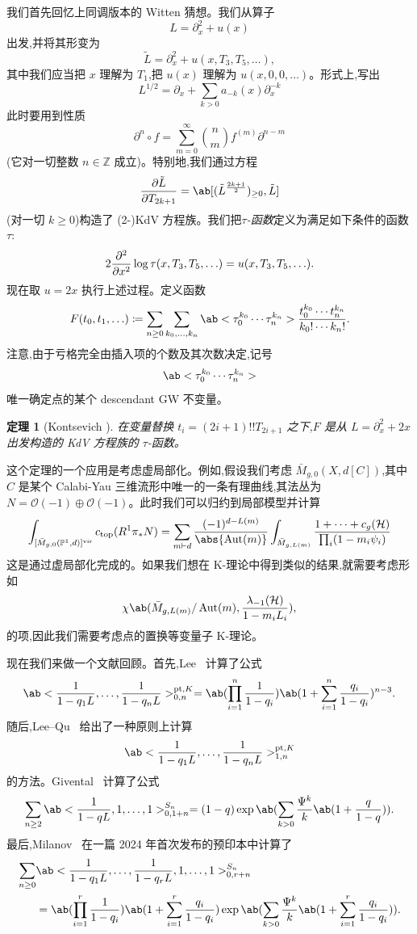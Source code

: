\documentclass{amsart}
\newtheorem{thm}{定理}[section]
\theoremstyle{definition}
\theoremstyle{remark}
\theoremstyle{plain}
\theoremstyle{definition}
\theoremstyle{remark}
\newcommand{\Z}{\mathbb{Z}}
\renewcommand{\P}{\mathbb{P}}
\newcommand{\mc}[1]{\mathcal{#1}}
\newcommand{\mr}[1]{\mathrm{#1}}
\newcommand{\1}{\mathbf{1}}
\newcommand{\2}{\mathbf{2}}
\newcommand{\3}{\mathbf{3}}
\newcommand{\vir}{\mr{vir}}
\DeclareMathOperator{\Aut}{Aut}
\begin{document}
我们首先回忆上同调版本的 Witten 猜想。我们从算子
\[ L = \partial_x^2 + u(x) \]
出发,并将其形变为
\[ \tilde{L} = \partial_x^2 + u(x, T_3, T_5, \ldots), \]
其中我们应当把 \(x\) 理解为 \(T_1\),把 \(u(x)\) 理解为 \(u(x, 0, 0,\ldots)\)。形式上,写出
\[ L^{1/2} = \partial_x + \sum_{k > 0} a_{-k}(x) \partial_x^{-k} \]
此时要用到性质
\[ \partial^n \circ f = \sum_{m = 0}^{\infty} \binom{n}{m} f^{(m)} \partial^{n-m} \]
(它对一切整数 \(n \in \Z\) 成立)。特别地,我们通过方程
\[ \pdv{\tilde{L}}{T_{2k+1}} = \ab[(\tilde{L}^{\frac{2k+1}{2}})_{\geq 0}, \tilde{L}] \]
(对一切 \(k \geq 0\))构造了 (2-)KdV 方程族。我们把\textit{\(\tau\)-函数}定义为满足如下条件的函数 \(\tau\):
\[ 2 \pdv[2]{}{x}\log \tau(x, T_3, T_5, \ldots) = u(x, T_3, T_5, \ldots). \]
现在取 \(u = 2x\) 执行上述过程。定义函数
\[ F(t_0, t_1, \ldots) \coloneqq \sum_{n \geq 0} \sum_{k_0, \ldots, k_n} \ab<\tau_0^{k_0} \cdots \tau_n^{k_n}> \frac{t_0^{k_0} \cdots t_n^{k_n}}{k_0! \cdots k_n!}. \]
注意,由于亏格完全由插入项的个数及其次数决定,记号
\[ \ab<\tau_0^{k_0} \cdots \tau_n^{k_n}> \]
唯一确定点的某个 descendant GW 不变量。

\begin{thm}[Kontsevich {\cite{Kontsevich1992}}]
    在变量替换 \(t_i = (2i+1)!! T_{2i+1}\) 之下,\(F\) 是从 \(L = \partial_x^2 + 2x\) 出发构造的 KdV 方程族的 \(\tau\)-函数。
\end{thm}

这个定理的一个应用是考虑虚局部化。例如,假设我们考虑 \(\bar{M}_{g,0}(X, d[C])\),其中 \(C\) 是某个 Calabi-Yau 三维流形中唯一的一条有理曲线,其法丛为 \(N = \mc{O}(-1)\oplus \mc{O}(-1)\)。此时我们可以归约到局部模型并计算
\begin{align*}
    \int_{[\bar{M}_{g,0}(\P^1, d)]^{\vir}} c_{\mr{top}}(R^1 \pi_* N) = \sum_{m \vdash d} \frac{(-1)^{d-L(m)}}{\abs{\Aut(m)}} \int_{\bar{M}_{g, L(m)}} \frac{1 + \cdots + c_g(\mc{H})}{\prod_i (1-m_i \psi_i)}
\end{align*}
这是通过虚局部化完成的。如果我们想在 K-理论中得到类似的结果,就需要考虑形如
\[ \chi\ab(\bar{M}_{g, L(m)}/\Aut(m), \frac{\lambda_{-1}(\mc{H})}{1-m_i L_i}), \]
的项,因此我们需要考虑点的置换等变量子 K-理论。

现在我们来做一个文献回顾。首先,Lee~\cite{Lee1997} 计算了公式
\[ \ab<\frac{1}{1-q_1 L}, \ldots, \frac{1}{1-q_n L}>_{0,n}^{\mr{pt}, K} = \ab(\prod_{i=1}^n \frac{1}{1-q_i}) \ab(1 + \sum_{i=1}^n \frac{q_i}{1-q_i})^{n-3}. \]
随后,Lee--Qu~\cite{LeeQu2014} 给出了一种原则上计算
\[ \ab<\frac{1}{1-q_1 L}, \ldots, \frac{1}{1-q_n L}>_{1,n}^{\mr{pt}, K} \]
的方法。Givental~\cite{Givental2017K1} 计算了公式
\[ \sum_{n \geq 2} \ab<\frac{1}{1-q L}, 1, \ldots, 1>_{0,1+n}^{S_n} = (1-q) \exp\ab(\sum_{k > 0} \frac{\Psi^k}{k} \ab(1 + \frac{q}{1-q})). \]
最后,Milanov~\cite{Milanov2025} 在一篇 2024 年首次发布的预印本中计算了
\begin{align*}
    \sum_{n \geq 0}& \ab<\frac{1}{1-q_1 L}, \ldots, \frac{1}{1-q_r L}, 1, \ldots, 1>_{0,r+n}^{S_n} \\
    &= \ab(\prod_{i=1}^{r} \frac{1}{1-q_i})\ab(1 + \sum_{i=1}^r \frac{q_i}{1-q_i}) \exp\ab(\sum_{k > 0} \frac{\Psi^k}{k} \ab(1 + \sum_{i=1}^r \frac{q_i}{1-q_i})). 
\end{align*}
\end{document}
